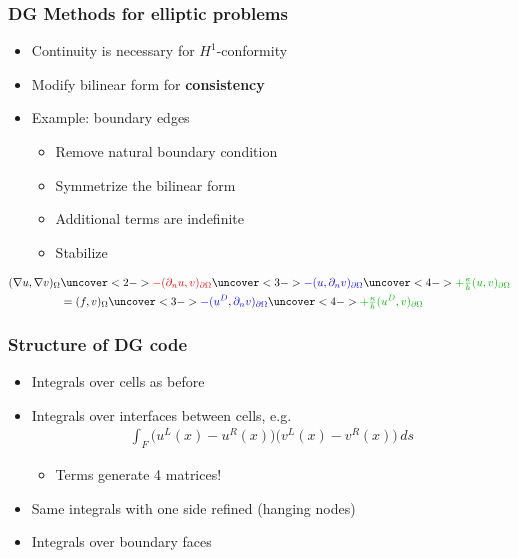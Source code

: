 \begin{frame}
  \frametitle{DG Methods for elliptic problems}
  \begin{itemize}
  \item Continuity is necessary for $H^1$-conformity
  \item Modify bilinear form for \textbf{consistency}
  \item Example: boundary edges
    \begin{itemize}
    \item<2-> \red Remove \black natural boundary condition
    \item<3-> \blue Symmetrize the bilinear form \black
    \item<3-> Additional terms are indefinite
    \item<4-> \green Stabilize\black
    \end{itemize}
  \end{itemize}
  \begin{align*}
    (\nabla u, \nabla v)_\Omega&
    \uncover<2->{\red -(\partial_n u, v)_{\partial \Omega}\black} 
    \uncover<3->{\blue -(u, \partial_n v)_{\partial \Omega}\black}
    \uncover<4->{\green +\tfrac{\kappa}{h}(u, v)_{\partial \Omega}\black}
    \\&=
    (f,v)_\Omega
    \uncover<3->{\blue -(u^D, \partial_n v)_{\partial \Omega}\black}
    \uncover<4->{\green +\tfrac{\kappa}{h}(u^D, v)_{\partial \Omega}\black}
  \end{align*}
\end{frame}

\begin{frame}
  \frametitle{Structure of DG code}
  \begin{itemize}
  \item Integrals over cells as before
  \item Integrals over interfaces between cells, e.g.
    \begin{gather*}
      \int_F \bigl(u^L(x)-u^R(x)\bigr) \bigl(v^L(x)-v^R(x)\bigr)
      \,ds
    \end{gather*}
    \begin{itemize}
    \item Terms generate 4 matrices!
    \end{itemize}
  \item Same integrals with one side refined (hanging nodes)
  \item Integrals over boundary faces
  \end{itemize}
\end{frame}

